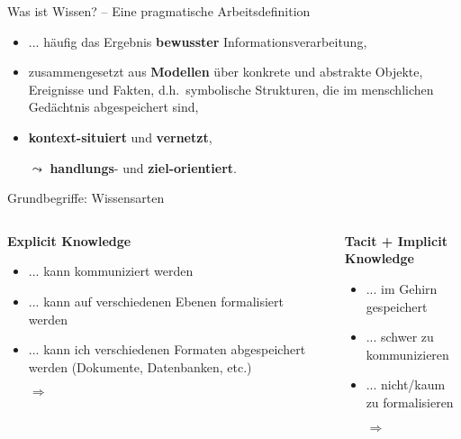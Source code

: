 \documentclass[aspectratio=1610,onlymath]{beamer}
\begin{document}
\begin{frame}{Was ist Wissen? – Eine pragmatische Arbeitsdefinition}

{\Huge {}}
\vspace{2em}
\begin{itemize}
	\item ... häufig das Ergebnis \textbf{bewusster} Informationsverarbeitung, \vspace{0,5em}
	\item zusammengesetzt aus \textbf{Modellen} über konkrete und abstrakte Objekte, Ereignisse und Fakten, d.h.\ \alert{symbolische Strukturen}, die im menschlichen Gedächtnis abgespeichert sind, \vspace{0,5em}
	\item \textbf{kontext-situiert} und \textbf{vernetzt}, \vspace{0,5em}
	\item[$\leadsto$] \textbf{handlungs}- und \textbf{ziel-orientiert}.
\end{itemize}
\end{frame}



\begin{frame}{Grundbegriffe: Wissensarten}

\begin{columns}[t]
\begin{column}{0.5\textwidth}
\alert{\textbf{Explicit Knowledge}}
\begin{itemize}
	\item ... kann kommuniziert werden
	\item ... kann auf verschiedenen Ebenen formalisiert werden
	\item ... kann ich verschiedenen Formaten abgespeichert werden (Dokumente, Datenbanken, etc.)
	\item[] $\Rightarrow$ 
\end{itemize}
\end{column}
\begin{column}{0.5\textwidth}
\alert{\textbf{Tacit + Implicit Knowledge}}
\begin{itemize}
	\item ... im Gehirn gespeichert 
	\item ... schwer zu kommunizieren 
	\item ... nicht/kaum zu formalisieren
	\item[] $\Rightarrow$ 
\end{itemize}
\end{column}
\end{columns}

\end{frame}
\end{document}
